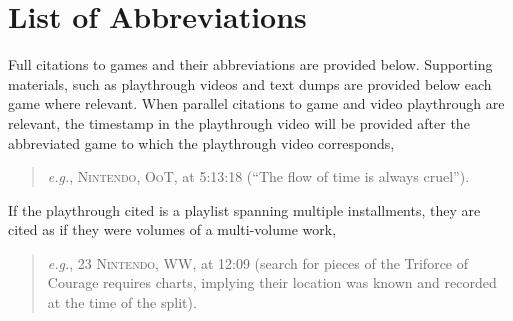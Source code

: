 \documentclass[./Notes.tex]{subfiles}
\begin{document}
  \section*{List of Abbreviations}
  Full citations to games and their abbreviations are provided below. Supporting materials, such as playthrough videos and text dumps are provided below each game where relevant. When parallel citations to game and video playthrough are relevant, the timestamp in the playthrough video will be provided after the abbreviated game to which the playthrough video corresponds, \begin{quote}
  \textit{e.g.}, \textsc{Nintendo, OoT}, at 5:13:18 (``The flow of time is always cruel'').
  \end{quote} If the playthrough cited is a playlist spanning multiple installments, they are cited as if they were volumes of a multi-volume work, \begin{quote}
  \textit{e.g.}, 23 \textsc{Nintendo, WW}, at 12:09 (search for pieces of the Triforce of Courage requires charts, implying their location was known and recorded at the time of the split).\end{quote}
\end{document}
